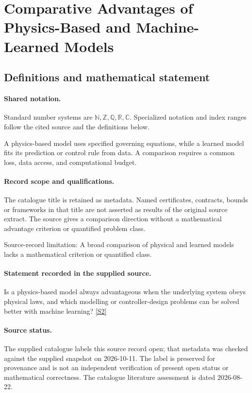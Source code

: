 \documentclass[11pt]{article}
\newcommand{\sref}[2]{\hyperlink{source:#1:#2}{[S#2]}}
\begin{document}
\section{Comparative Advantages of Physics-Based and Machine-Learned Models}\label{statement}

\subsection{Definitions and mathematical statement}

\paragraph{Shared notation.}Standard number systems are $\mathbb N,\mathbb Z,\mathbb Q,\mathbb R,\mathbb C$. Specialized notation and index ranges follow the cited source and the definitions below.


A physics-based model uses specified governing equations, while a learned model fits its prediction or control rule from data. A comparison requires a common loss, data access, and computational budget.
\paragraph{Record scope and qualifications.}
The catalogue title is retained as metadata. Named certificates, contracts, bounds or frameworks in that title are not asserted as results of the original source extract.
The source gives a comparison direction without a mathematical advantage criterion or quantified problem class.

Source-record limitation: A broad comparison of physical and learned models lacks a mathematical criterion or quantified class.
\paragraph{Statement recorded in the supplied source.}
Is a physics-based model always advantageous when the underlying system obeys physical laws, and which modelling or controller-design problems can be solved better with machine learning? \sref{statement}{2}
\paragraph{Source status.}
The supplied catalogue labels this source record open; that metadata was checked against the supplied snapshot on 2026-10-11. The label is preserved for provenance and is not an independent verification of present open status or mathematical correctness. The catalogue literature assessment is dated 2026-08-22.
\end{document}
